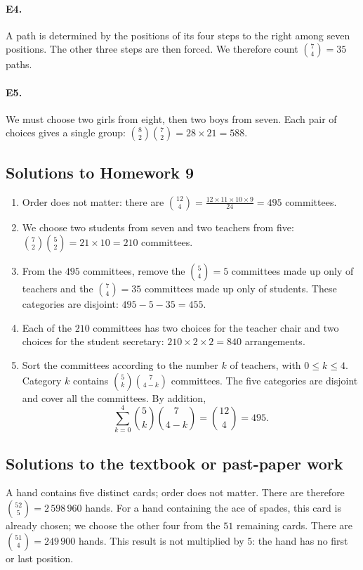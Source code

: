 \paragraph{E4.}A path is determined by the positions of its four steps to the right among seven positions. The other three steps are then forced. We therefore count $\binom74=35$ paths.

\paragraph{E5.}We must choose two girls from eight, then two boys from seven. Each pair of choices gives a single group: $\binom82\binom72=28\times21=588$.


\subsection{Solutions to Homework 9}\begin{enumerate}
\item Order does not matter: there are $\binom{12}{4}=\frac{12\times11\times10\times9}{24}=495$ committees.
\item We choose two students from seven and two teachers from five: $\binom72\binom52=21\times10=210$ committees.
\item From the $495$ committees, remove the $\binom54=5$ committees made up only of teachers and the $\binom74=35$ committees made up only of students. These categories are disjoint: $495-5-35=455$.
\item Each of the $210$ committees has two choices for the teacher chair and two choices for the student secretary: $210\times2\times2=840$ arrangements.
\item Sort the committees according to the number $k$ of teachers, with $0\le k\le4$. Category $k$ contains $\binom5k\binom7{4-k}$ committees. The five categories are disjoint and cover all the committees. By addition,
\[\sum_{k=0}^4\binom5k\binom7{4-k}=\binom{12}4=495.\]
\end{enumerate}

\subsection{Solutions to the textbook or past-paper work}A hand contains five distinct cards; order does not matter. There are therefore $\binom{52}5=2\,598\,960$ hands. For a hand containing the ace of spades, this card is already chosen; we choose the other four from the $51$ remaining cards. There are $\binom{51}4=249\,900$ hands. This result is not multiplied by $5$: the hand has no first or last position.

\fi


